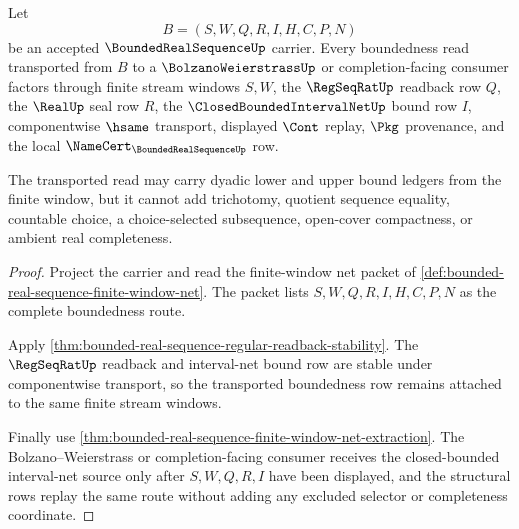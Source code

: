 \begin{theorem}
\label{thm:bounded-real-sequence-dyadic-bound-transport}
Let
$$
B=(S,W,Q,R,I,H,C,P,N)
$$
be an accepted $\BoundedRealSequenceUp$ carrier. Every boundedness read transported from $B$ to a $\BolzanoWeierstrassUp$ or completion-facing consumer factors through finite stream windows $S,W$, the $\RegSeqRatUp$ readback row $Q$, the $\RealUp$ seal row $R$, the $\ClosedBoundedIntervalNetUp$ bound row $I$, componentwise $\hsame$ transport, displayed $\Cont$ replay, $\Pkg$ provenance, and the local $\NameCert_{\BoundedRealSequenceUp}$ row.

The transported read may carry dyadic lower and upper bound ledgers from the finite window, but it cannot add trichotomy, quotient sequence equality, countable choice, a choice-selected subsequence, open-cover compactness, or ambient real completeness.
\end{theorem}
\begin{proof}
Project the carrier and read the finite-window net packet of \autoref{def:bounded-real-sequence-finite-window-net}. The packet lists $S,W,Q,R,I,H,C,P,N$ as the complete boundedness route.

Apply \autoref{thm:bounded-real-sequence-regular-readback-stability}. The $\RegSeqRatUp$ readback and interval-net bound row are stable under componentwise transport, so the transported boundedness row remains attached to the same finite stream windows.

Finally use \autoref{thm:bounded-real-sequence-finite-window-net-extraction}. The Bolzano--Weierstrass or completion-facing consumer receives the closed-bounded interval-net source only after $S,W,Q,R,I$ have been displayed, and the structural rows replay the same route without adding any excluded selector or completeness coordinate.
\end{proof}


